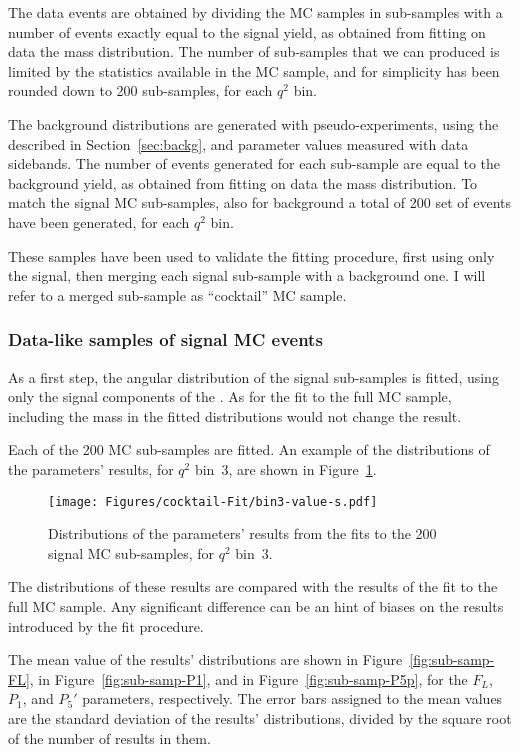 The data events are obtained by dividing the MC samples in sub-samples with a number of events exactly equal to the signal yield, as obtained from fitting on data the \PBz mass distribution.
The number of sub-samples that we can produced is limited by the statistics available in the MC sample, and for simplicity has been rounded down to 200 sub-samples, for each $q^2$ bin.

The background distributions are generated with pseudo-experiments, using the \pdf described in Section~\ref{sec:backg}, and parameter values measured with data sidebands.
The number of events generated for each sub-sample are equal to the background yield, as obtained from fitting on data the \PBz mass distribution.
To match the signal MC sub-samples, also for background a total of 200 set of events have been generated, for each $q^2$ bin.

These samples have been used to validate the fitting procedure, first using only the signal, then merging each signal sub-sample with a background one.
I will refer to a merged sub-sample as ``cocktail'' MC sample.

\subsubsection{Data-like samples of signal MC events}
\label{sec:Cocktail-MC-pure}

As a first step, the angular distribution of the signal sub-samples is fitted, using only the signal components of the \pdf.
As for the fit to the full MC sample, including the mass in the fitted distributions would not change the result.

Each of the 200 MC sub-samples are fitted.
An example of the distributions of the parameters' results, for $q^2$ bin~3, are shown in Figure~\ref{fig:closure-signal-cocktail-bin3}.

\begin{figure}[!hbt]
  \centering
  \texttt{[image: Figures/cocktail-Fit/bin3-value-s.pdf]}
  \caption{Distributions of the parameters' results from the fits to the 200 signal MC sub-samples, for $q^2$ bin~3.}
  \label{fig:closure-signal-cocktail-bin3}
\end{figure}

The distributions of these results are compared with the results of the fit to the full MC sample.
Any significant difference can be an hint of biases on the results introduced by the fit procedure.

The mean value of the results' distributions are shown in Figure~\ref{fig:sub-samp-FL}, in Figure~\ref{fig:sub-samp-P1}, and in Figure~\ref{fig:sub-samp-P5p}, for the $F_L$, $P_1$, and $P_5'$ parameters, respectively.
The error bars assigned to the mean values are the standard deviation of the results' distributions, divided by the square root of the number of results in them. 

